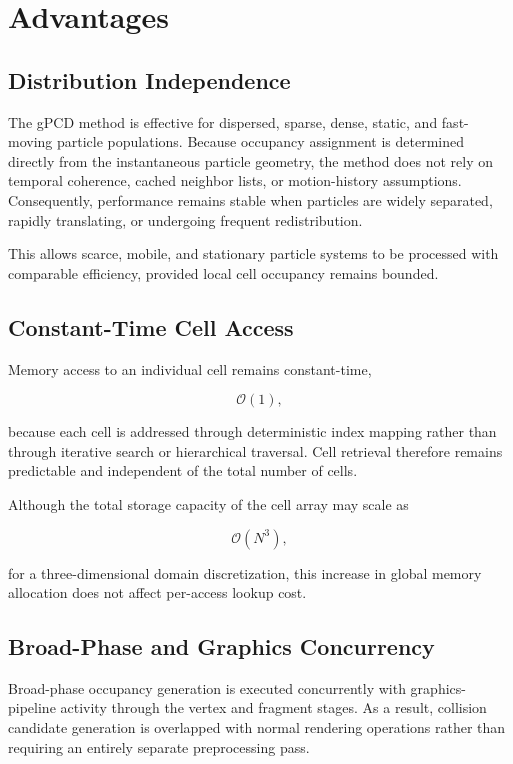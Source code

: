 \section{Advantages}

\subsection{Distribution Independence}

The gPCD method is effective for dispersed, sparse, dense, static, and fast-moving particle populations. Because occupancy assignment is determined directly from the instantaneous particle geometry, the method does not rely on temporal coherence, cached neighbor lists, or motion-history assumptions. Consequently, performance remains stable when particles are widely separated, rapidly translating, or undergoing frequent redistribution.

This allows scarce, mobile, and stationary particle systems to be processed with comparable efficiency, provided local cell occupancy remains bounded.

\subsection{Constant-Time Cell Access}

Memory access to an individual cell remains constant-time,

\[
\mathcal{O}(1),
\]

because each cell is addressed through deterministic index mapping rather than through iterative search or hierarchical traversal. Cell retrieval therefore remains predictable and independent of the total number of cells.

Although the total storage capacity of the cell array may scale as

\[
\mathcal{O}(N^3),
\]

for a three-dimensional domain discretization, this increase in global memory allocation does not affect per-access lookup cost.

\subsection{Broad-Phase and Graphics Concurrency}

Broad-phase occupancy generation is executed concurrently with graphics-pipeline activity through the vertex and fragment stages. As a result, collision candidate generation is overlapped with normal rendering operations rather than requiring an entirely separate preprocessing pass.

